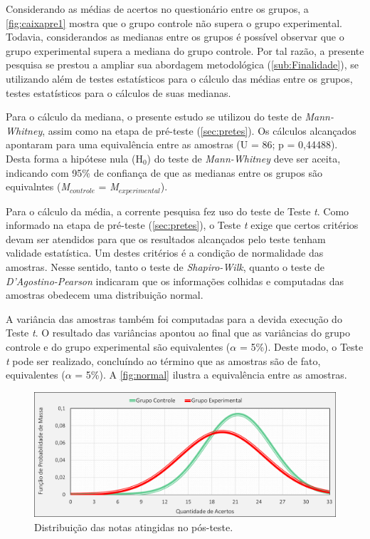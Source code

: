 Considerando as médias de acertos no questionário entre os grupos, a \autoref{fig:caixapre1} mostra que o grupo controle não supera o grupo experimental. Todavia, considerandos as medianas entre os grupos é possível observar que o grupo experimental supera a mediana do grupo controle. Por tal razão, a presente pesquisa se prestou a ampliar sua abordagem metodológica (\autoref{sub:Finalidade}), se utilizando além de testes estatísticos para o cálculo das médias entre os grupos, testes estatísticos para o cálculos de suas medianas. 

Para o cálculo da mediana, o presente estudo se utilizou do teste de \textit{Mann-Whitney}, assim como na etapa de pré-teste (\autoref{sec:pretes}). Os cálculos alcançados apontaram para uma equivalência entre as amostras (U = 86; p = 0,44488). Desta forma a hipótese nula (H$_0$) do teste de \textit{Mann-Whitney} deve ser aceita, indicando com 95\% de confiança de que as medianas entre os grupos são equivalntes (\textit{M}$_{controle}$ = \textit{M}$_{experimental}$). 

Para o cálculo da média, a corrente pesquisa fez uso do teste de Teste \textit{t}. Como informado na etapa de pré-teste (\autoref{sec:pretes}), o Teste \textit{t} exige que certos critérios devam ser atendidos para que os resultados alcançados pelo teste tenham validade estatística. Um destes critérios é a condição de normalidade das amostras. Nesse sentido, tanto o teste de \textit{Shapiro-Wilk}, quanto o teste de \textit{D'Agostino-Pearson} indicaram que os informações colhidas e computadas das amostras obedecem uma distribuição normal. 

A variância das amostras também foi computadas para a devida execução do Teste \textit{t}. O resultado das variâncias apontou ao final que as variâncias do grupo controle e do grupo experimental são equivalentes ($\alpha$ = 5\%). Deste modo, o Teste \textit{t} pode ser realizado, concluíndo ao término que as amostras são de fato, equivalentes ($\alpha$ = 5\%). A \autoref{fig:normal} ilustra a equivalência entre as amostras.

\pagebreak

\begin{figure}[htb]
    \centering
    \caption{\label{fig:normal1}Distribuição das notas atingidas no pós-teste.}
    \includegraphics[width=\linewidth]{./Visuais/GraficosPosteste.pdf}
\end{figure}


